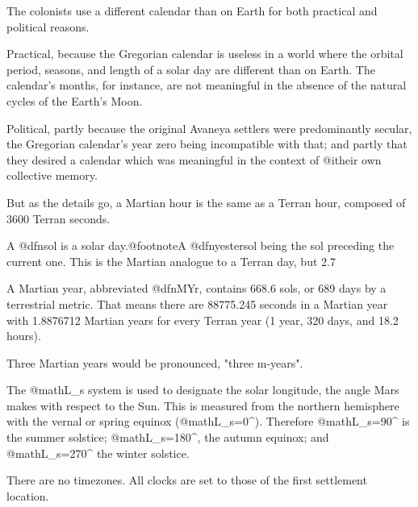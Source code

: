 
The colonists use a different calendar than on Earth for both practical and political reasons.

Practical, because the Gregorian calendar is useless in a world where the orbital period, seasons, and length of a solar day are different than on Earth. The calendar's months, for instance, are not meaningful in the absence of the natural cycles of the Earth's Moon.

Political, partly because the original Avaneya settlers were predominantly secular, the Gregorian calendar's year zero being incompatible with that; and partly that they desired a calendar which was meaningful in the context of @i{their own} collective memory.

But as the details go, a Martian hour is the same as a Terran hour, composed of 3600 Terran seconds.

A @dfn{sol} is a solar day.@footnote{A @dfn{yestersol} being the sol preceding the current one.} This is the Martian analogue to a Terran day, but 2.7 %

A Martian year, abbreviated @dfn{MYr}, contains 668.6 sols, or 689 days by a terrestrial metric. That means there are 88775.245 seconds in a Martian year with 1.8876712 Martian years for every Terran year (1 year, 320 days, and 18.2 hours). 

Three Martian years would be pronounced, "three m-years".

The @math{L_s} system is used to designate the solar longitude, the angle Mars makes with respect to the Sun. This is measured from the northern hemisphere with the vernal or spring equinox (@math{L_s=0^{\circ}}). Therefore @math{L_s=90^{\circ}} is the summer solstice; @math{L_s=180^{\circ}}, the autumn equinox; and @math{L_s=270^{\circ}} the winter solstice. 

There are no timezones. All clocks are set to those of the first settlement location.


